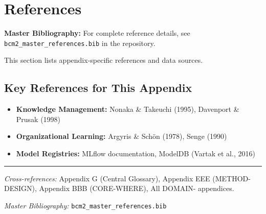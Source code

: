 \section{References}
\label{sec:fff-references}

\begin{tcolorbox}[colback=blue!5!white, colframe=blue!75!black]
\textbf{Master Bibliography:} For complete reference details, see
\texttt{bcm2\_master\_references.bib} in the repository.

This section lists appendix-specific references and data sources.
\end{tcolorbox}

\vspace{0.5em}

\subsection{Key References for This Appendix}

\begin{itemize}[nosep]
    \item \textbf{Knowledge Management:} Nonaka \& Takeuchi (1995), Davenport \& Prusak (1998)
    \item \textbf{Organizational Learning:} Argyris \& Schön (1978), Senge (1990)
    \item \textbf{Model Registries:} MLflow documentation, ModelDB (Vartak et al., 2016)
\end{itemize}

\nocite{bcm_master}



\vspace{1em}
\hrule
\vspace{0.5em}

\noindent\textit{Cross-references:}
Appendix G (Central Glossary),
Appendix EEE (METHOD-DESIGN),
Appendix BBB (CORE-WHERE),
All DOMAIN- appendices.

\noindent\textit{Master Bibliography:} \texttt{bcm2\_master\_references.bib}


